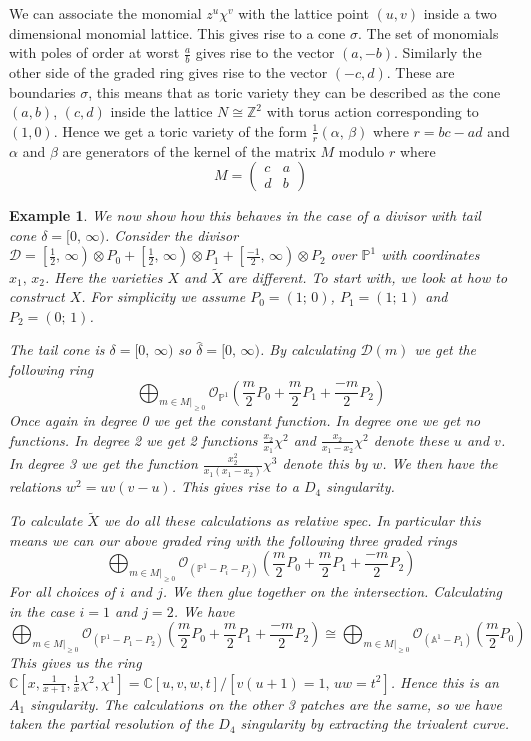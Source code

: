 \documentclass[12pt,a4paper]{book}      %
\newtheorem{ex}[thm]{Example}
\newcommand{\mb}[1]{\mathbb{#1}}
\begin{document}
We can associate the monomial $z^u \chi^v$ with the lattice point $(u,v)$ inside a two dimensional monomial lattice. This gives rise to a cone $\sigma$. The set of monomials with poles of order at worst $\frac{a}{b}$ gives rise to the vector $(a, -b)$. Similarly the other side of the graded ring gives rise to the vector $(-c, d)$. These are boundaries $\sigma$, this means that as toric variety they can be described as the cone $(a,b)$, $(c,d)$ inside the lattice $N \cong \mathbb{Z}^2$ with torus action corresponding to $(1,0)$.  Hence we get a toric variety of the form $\frac{1}{r}(\alpha, \, \beta)$ where $r = bc-ad$ and $\alpha$ and $\beta$ are generators of the kernel of the matrix $M$ modulo $r$ where
\[
M = \left( \begin{array}{cc} c & a \\ d & b \end{array} \right)
\]


\begin{ex}\rm
We now show how this behaves in the case of a divisor with tail cone $\delta = [0, \, \infty)$. Consider the divisor $\mathcal{D} = \left[\frac{1}{2}, \, \infty \right) \otimes P_0 + \left[\frac{1}{2}, \, \infty \right) \otimes P_1 + \left[\frac{-1}{2}, \, \infty \right) \otimes P_2$ over $\mb{P}^1$ with coordinates $x_1, \, x_2$. Here the varieties $X$ and $\widetilde{X}$ are different. To start with, we look at how to construct $X$. For simplicity we assume $P_0 = (1; \, 0)$, $P_1 = (1; \, 1)$ and $P_2 = (0; \, 1)$.

The tail cone is $\delta = [0, \, \infty)$ so $\hat\delta = [0, \, \infty)$. By calculating $\mathcal{D}(m)$ we get the following ring
\[
\bigoplus_{m \in M|_{\geq 0}} \mathcal{O}_{\mb{P}^1} \left( \frac{m}{2} P_0 + \frac{m}{2} P_1 + \frac{-m}{2} P_2 \right)
\]
Once again in degree 0 we get the constant function. In degree one we get no functions. In degree 2 we get 2 functions $\frac{x_2}{x_1} \chi^2 $ and $\frac{x_2}{x_1-x_2} \chi^2$ denote these $u$ and $v$. In degree 3 we get the function $\frac{x_2^2}{x_1(x_1-x_2)} \chi^3 $ denote this by $w$. We then have the relations $w^2 = uv(v-u)$. This gives rise to a $D_4$ singularity.  

To calculate $\widetilde{X}$ we do all these calculations as relative spec. In particular this means we can our above graded ring with the following three graded rings
\[
\bigoplus_{m \in M|_{\geq 0}} \mathcal{O}_{(\mb{P}^1 - P_i - P_j)} \left( \frac{m}{2} P_0 + \frac{m}{2} P_1 + \frac{-m}{2} P_2 \right)
\]
For all choices of $i$ and $j$. We then glue together on the intersection. Calculating in the case $i=1$ and $j =2$. We have
\[
\bigoplus_{m \in M|_{\geq 0}} \mathcal{O}_{(\mb{P}^1 - P_1 - P_2)} \left( \frac{m}{2} P_0 + \frac{m}{2} P_1 + \frac{-m}{2} P_2 \right) \cong \bigoplus_{m \in M|_{\geq 0}} \mathcal{O}_{(\mb{A}^1 - P_1)} (\frac{m}{2}P_0)
\]
This gives us the ring $\mb{C}[x, \frac{1}{x+1}, \frac{1}{x}\chi^2, \chi^1] = \mb{C}[u,v,w,t]/[v(u+1) = 1, \, uw = t^2]$. Hence this is an $A_1$ singularity. The calculations on the other 3 patches are the same, so we have taken the partial resolution of the $D_4$ singularity by extracting the trivalent curve. 
\end{ex}
\end{document}
